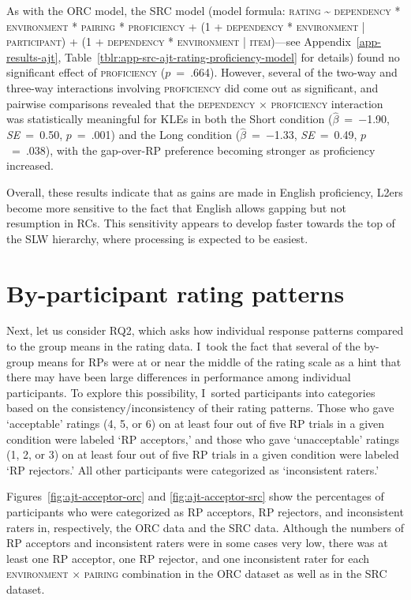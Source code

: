 As with the ORC model, the SRC model (model formula: \textsc{rating \~{} dependency * environment * pairing * proficiency + (1 + dependency * environment | participant) + (1 + dependency * environment | item)}---see Appendix~\ref{app-results-ajt}, Table~\ref{tblr:app-src-ajt-rating-proficiency-model} for details) found no significant effect of \textsc{proficiency} ($p$~=~.664). However, several of the two-way and three-way interactions involving \textsc{proficiency} did come out as significant, and pairwise comparisons revealed that the \textsc{dependency} × \textsc{proficiency} interaction was statistically meaningful for KLEs in both the Short condition ($\hat{\beta}$~=~−1.90, \textit{SE}~=~0.50, $p$~=~.001) and the Long condition ($\hat{\beta}$~=~−1.33, \textit{SE}~=~0.49, $p$~=~.038), with the gap-over-RP preference becoming stronger as proficiency increased.

Overall, these results indicate that as gains are made in English proficiency, L2ers become more sensitive to the fact that English allows gapping but not resumption in RCs. This sensitivity appears to develop faster towards the top of the SLW hierarchy, where processing is expected to be easiest.

\section{By-participant rating patterns}\label{ajt-individual}

Next, let us consider RQ2, which asks how individual response patterns compared to the group means in the rating data. I~took the fact that several of the by-group means for RPs were at or near the middle of the rating scale as a hint that there may have been large differences in performance among individual participants. To explore this possibility, I~sorted participants into categories based on the consistency/inconsistency of their rating patterns. Those who gave `acceptable' ratings (4, 5, or 6) on at least four out of five RP trials in a given condition were labeled `RP acceptors,' and those who gave `unacceptable' ratings (1, 2, or 3) on at least four out of five RP trials in a given condition were labeled `RP rejectors.' All other participants were categorized as `inconsistent raters.'

Figures~\ref{fig:ajt-acceptor-orc} and \ref{fig:ajt-acceptor-src} show the percentages of participants who were categorized as RP acceptors, RP rejectors, and inconsistent raters in, respectively, the ORC data and the SRC data. Although the numbers of RP acceptors and inconsistent raters were in some cases very low, there was at least one RP acceptor, one RP rejector, and one inconsistent rater for each \textsc{environment} × \textsc{pairing} combination in the ORC dataset as well as in the SRC dataset. 

